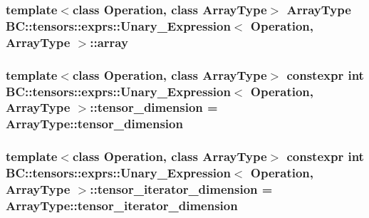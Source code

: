 \subsubsection[{\texorpdfstring{array}{array}}]{\setlength{\rightskip}{0pt plus 5cm}template$<$class Operation, class Array\+Type$>$ Array\+Type {\bf B\+C\+::tensors\+::exprs\+::\+Unary\+\_\+\+Expression}$<$ Operation, Array\+Type $>$\+::{\bf array}}\hypertarget{structBC_1_1tensors_1_1exprs_1_1Unary__Expression_a244683d3774d5c81a77b2e85be9d4f0c}{}\label{structBC_1_1tensors_1_1exprs_1_1Unary__Expression_a244683d3774d5c81a77b2e85be9d4f0c}
\subsubsection[{\texorpdfstring{tensor\+\_\+dimension}{tensor_dimension}}]{\setlength{\rightskip}{0pt plus 5cm}template$<$class Operation, class Array\+Type$>$ constexpr int {\bf B\+C\+::tensors\+::exprs\+::\+Unary\+\_\+\+Expression}$<$ Operation, Array\+Type $>$\+::tensor\+\_\+dimension = Array\+Type\+::tensor\+\_\+dimension\hspace{0.3cm}{\ttfamily [static]}}\hypertarget{structBC_1_1tensors_1_1exprs_1_1Unary__Expression_a1ee189194c7c294c273ad45156b45c36}{}\label{structBC_1_1tensors_1_1exprs_1_1Unary__Expression_a1ee189194c7c294c273ad45156b45c36}
\subsubsection[{\texorpdfstring{tensor\+\_\+iterator\+\_\+dimension}{tensor_iterator_dimension}}]{\setlength{\rightskip}{0pt plus 5cm}template$<$class Operation, class Array\+Type$>$ constexpr int {\bf B\+C\+::tensors\+::exprs\+::\+Unary\+\_\+\+Expression}$<$ Operation, Array\+Type $>$\+::tensor\+\_\+iterator\+\_\+dimension = Array\+Type\+::tensor\+\_\+iterator\+\_\+dimension\hspace{0.3cm}{\ttfamily [static]}}\hypertarget{structBC_1_1tensors_1_1exprs_1_1Unary__Expression_a26db9f70d37b660cf350436ca0d76d1a}{}\label{structBC_1_1tensors_1_1exprs_1_1Unary__Expression_a26db9f70d37b660cf350436ca0d76d1a}


